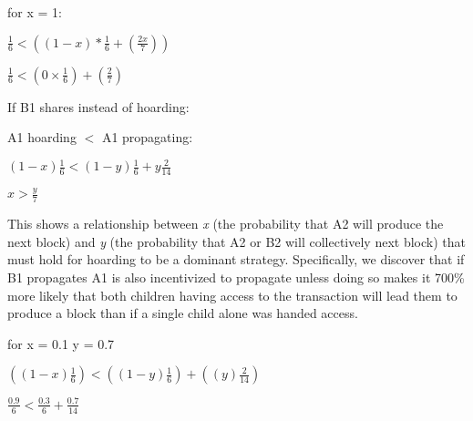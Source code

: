 \documentclass[oneside]{article}   	%
\begin{document}
\begin{multicols}{2}
for x = 1:

\large
\begin{adjustwidth}{1.5em}{1.5em} 
	\begin{math}
\frac{1}{6} < \left(\left(1 - x \right)*\frac{1}{6} + \left(\frac{2x}{7}\right)\right)
	\end{math}

	\begin{math}
\frac{1}{6} < \left( 0 \times \frac{1}{6} \right) + \left( \frac{2}{7} \right)
	\end{math}
\end{adjustwidth}
\normalsize


If B1 shares instead of hoarding:

A1 hoarding \begin{math}<\end{math} A1 propagating:

\large
\begin{adjustwidth}{1.5em}{1.5em} 
	\begin{math}
(1 - x) \frac{1}{6} < \left(1 - y\right) \frac{1}{6} + y \frac{2}{14}
	\end{math}

	\begin{math}
x > \frac{y}{7}
	\end{math}
\end{adjustwidth}
\normalsize

This shows a relationship between \textit{x} (the probability that A2 will produce the next block) and \textit{y} (the probability that A2 or B2 will collectively next block) that must hold for hoarding to be a dominant strategy. Specifically, we discover that if B1 propagates A1 is also incentivized to propagate unless doing so makes it 700\% more likely that both children having access to the transaction will lead them to produce a block than if a single child alone was handed access.

for x = 0.1 y = 0.7

\normalsize
\begin{adjustwidth}{1.5em}{1.5em} 
	\begin{math}
\left( \left( 1 - x \right) \frac{1}{6} \right) < \left( \left( 1 - y \right) \frac{1}{6} \right) + \left( \left( y \right) \frac{2}{14} \right)
	\end{math}

	\begin{math}
\frac{0.9}{6} < \frac{0.3}{6} + \frac{0.7}{14}
	\end{math}


\end{adjustwidth}
\end{multicols}
\end{document}
